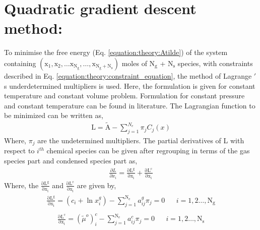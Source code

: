 \documentclass[letterpaper,10pt,english]{sphinxmanual}
\begin{document}
\section{Quadratic gradient descent method:}
\label{\detokenize{theory:quadratic-gradient-descent-method}}
To minimise the free energy (Eq. \eqref{equation:theory:Atilde}) of the system
containing \(\mathrm{(x_1, x_2,\ldots x_{N_g},
\ldots,x_{N_g + N_s})}\) moles of \(\mathrm{N_g}\) + \(\mathrm{N_s}\) species, with
constraints described in Eq. \eqref{equation:theory:constraint_equation}, the method of
Lagrange \('\) s underdetermined multipliers is used. Here, the formulation
is given for constant temperature and constant volume problem. Formulation for
constant pressure and constant temperature can be found in literature.
The Lagrangian function to be minimized can be written as,
\begin{equation}\label{equation:theory:eq_to_mini}
\begin{split}\mathrm{L} = \mathrm{\tilde{A}} - \sum_{j=1}^{N_e}\pi_j C_j(x)\end{split}
\end{equation}
Where, \(\pi_j\) are the undetermined multipliers. The partial
derivatives of L with respect to \(i^{th}\) chemical species can be given
after regrouping in terms of the gas species part and condensed species
part as,
\begin{equation}\label{equation:theory:gas_part}
\begin{split}\frac{\partial L}{\partial x_i} = \mathrm{\frac{\partial L^g}
{\partial x_i} +\frac{\partial L^c}{\partial x_i}}\end{split}
\end{equation}
Where, the \(\mathrm{\frac{\partial L^g}{\partial x_i}}\) and
\(\mathrm{\frac{\partial L^c}{\partial x_i}}\) are given by,
\begin{equation}\label{equation:theory:gas_langrage_multiplier}
\begin{split}\begin{aligned}
\mathrm{\frac{\partial L^g}{\partial x_i}} = (c_i + \ln x_i^g) -
\sum_{j=1}^{\mathrm{N_e}}a_{ij}^{g}\pi_j = 0 && i = 1,2\ldots,\mathrm{N_g}
\end{aligned}\end{split}
\end{equation}\begin{equation}\label{equation:theory:solid_langrage_multiplier}
\begin{split}\begin{aligned}
\mathrm{\frac{\partial L^c}{\partial x_i}}
 = {\left(\tilde{\mu}^o\right)}_i^c - \sum_{j=1}^{\mathrm{N_e}}a_{ij}^{c}
\pi_j = 0  &&i= 1,2\ldots,\mathrm{N_s}
\end{aligned}\end{split}
\end{equation}
\end{document}
